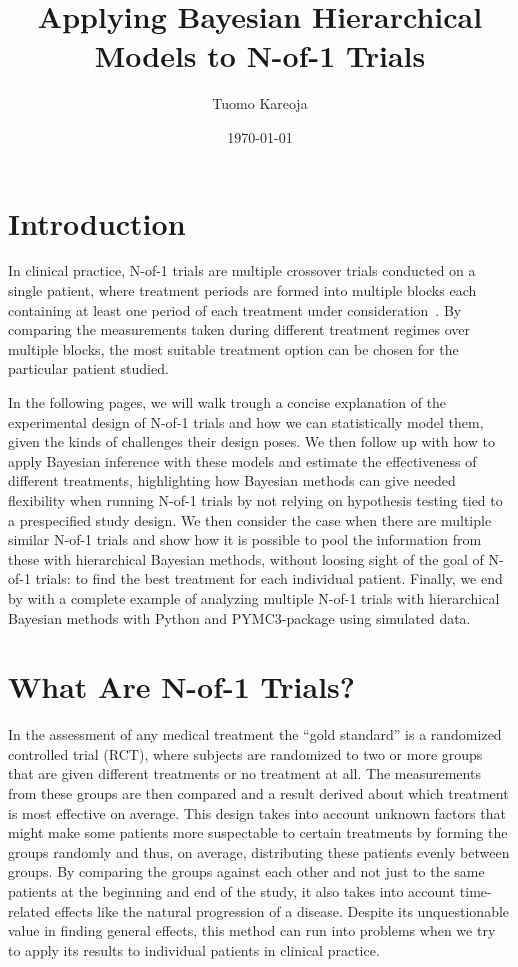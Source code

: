 \documentclass[12pt,a4paper,leqno]{report}
\title{Applying Bayesian Hierarchical Models to N-of-1 Trials}
\author{Tuomo Kareoja}
\date{\today}
\theoremstyle{plain}
\theoremstyle{definition}
\theoremstyle{remark}
\begin{document}
\maketitle

\tableofcontents

\chapter*{Introduction}\label{intro}

In clinical practice, N-of-1 trials are multiple crossover trials conducted on a
single patient, where treatment periods are formed into multiple blocks each
containing at least one period of each treatment under
consideration\ \cite{nofone}. By comparing the measurements taken during different
treatment regimes over multiple blocks, the most suitable treatment option can
be chosen for the particular patient studied.

In the following pages, we will walk trough a concise explanation of the
experimental design of N-of-1 trials and how we can statistically model them,
given the kinds of challenges their design poses. We then follow up with how to
apply Bayesian inference with these models and estimate the effectiveness of different
treatments, highlighting how Bayesian methods can give needed flexibility when
running N-of-1 trials by not relying on hypothesis testing tied to a
prespecified study design. We then consider the case when there are multiple
similar N-of-1 trials and show how it is possible to pool the information from
these with hierarchical Bayesian methods, without loosing sight of the goal of
N-of-1 trials: to find the best treatment for each individual
patient. Finally, we end by with a complete example of analyzing multiple N-of-1
trials with hierarchical Bayesian methods with Python and PYMC3-package using
simulated data.

\chapter{What Are N-of-1 Trials?}\label{nof1}

In the assessment of any medical treatment the ``gold standard'' is a randomized
controlled trial (RCT), where subjects are randomized to two or more groups that
are given different treatments or no treatment at all. The measurements from
these groups are then compared and a result derived about which treatment is
most effective on average. This design takes into account unknown factors that
might make some patients more suspectable to certain treatments by forming the
groups randomly and thus, on average, distributing these patients evenly between
groups. By comparing the groups against each other and not just to the same
patients at the beginning and end of the study, it also takes into account time-related
effects like the natural progression of a disease. Despite its unquestionable value
in finding general effects, this method can run into problems when we
try to apply its results to individual patients in clinical practice.
\end{document}
